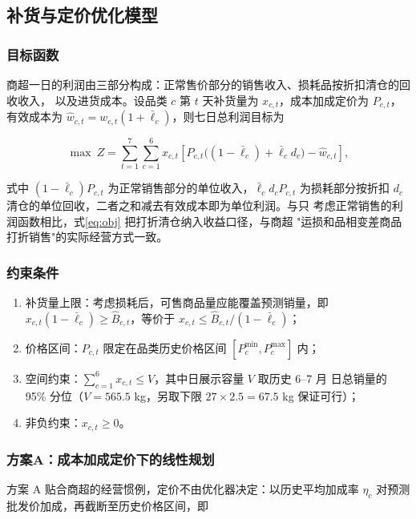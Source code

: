 \subsection{补货与定价优化模型}

\subsubsection{目标函数}

商超一日的利润由三部分构成：正常售价部分的销售收入、损耗品按折扣清仓的回收收入，
以及进货成本。设品类 $c$ 第 $t$ 天补货量为 $x_{c,t}$，成本加成定价为 $P_{c,t}$，
有效成本为 $\hat w_{c,t}=w_{c,t}(1+\bar\ell_c)$，则七日总利润目标为

\begin{equation}
\max\ Z=\sum_{t=1}^{7}\sum_{c=1}^{6}x_{c,t}\left[P_{c,t}\bigl((1-\bar\ell_c)+\bar\ell_c d_c\bigr)-\hat w_{c,t}\right],
\label{eq:obj}
\end{equation}

式中 $(1-\bar\ell_c)P_{c,t}$ 为正常销售部分的单位收入，$\bar\ell_c d_c P_{c,t}$
为损耗部分按折扣 $d_c$ 清仓的单位回收，二者之和减去有效成本即为单位利润。与只
考虑正常销售的利润函数相比，式\eqref{eq:obj} 把打折清仓纳入收益口径，与商超
"运损和品相变差商品打折销售"的实际经营方式一致。

\subsubsection{约束条件}

\begin{enumerate}[label=（\arabic*）]
\item 补货量上限：考虑损耗后，可售商品量应能覆盖预测销量，即
      $x_{c,t}(1-\bar\ell_c)\ge\hat B_{c,t}$，等价于
      $x_{c,t}\le\hat B_{c,t}/(1-\bar\ell_c)$；
\item 价格区间：$P_{c,t}$ 限定在品类历史价格区间 $[P_c^{\min},P_c^{\max}]$ 内；
\item 空间约束：$\sum_{c=1}^{6}x_{c,t}\le V$，其中日展示容量 $V$ 取历史 6--7 月
      日总销量的 95\% 分位（$V=565.5$ kg，另取下限 $27\times2.5=67.5$ kg 保证可行）；
\item 非负约束：$x_{c,t}\ge0$。
\end{enumerate}

\subsubsection{方案A：成本加成定价下的线性规划}

方案 A 贴合商超的经营惯例，定价不由优化器决定：以历史平均加成率 $\eta_c$ 对预测
批发价加成，再截断至历史价格区间，即

